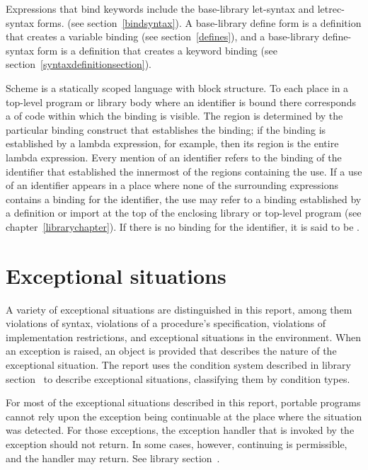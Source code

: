 Expressions that bind keywords include the base-library {\cf
  let-syntax} and {\cf letrec-syntax} forms.  (see
section~\ref{bindsyntax}).  A base-library {\cf define} form is a
definition that creates a variable binding (see
section~\ref{defines}), and a base-library {\cf define-syntax} form is
a definition that creates a keyword binding (see
section~\ref{syntaxdefinitionsection}).

\vest Scheme is a statically scoped language with
block structure.  To each place in a top-level program or library body where an identifier is bound 
there corresponds a  of code within which
the binding is visible.  The region is determined by the particular
binding construct that establishes the binding; if the binding is
established by a {\cf lambda} expression, for example, then its region
is the entire {\cf lambda} expression.  Every mention of an identifier
refers to the binding of the identifier that established the
innermost of the regions containing the use.  If a use of an
identifier appears in a place where none of the surrounding expressions
contains a binding for the identifier, the use may refer to a
binding established by a definition or import at the top of the
enclosing library or top-level program
(see chapter~\ref{librarychapter}).
If there is no binding for the identifier,
it is said to be .

\section{Exceptional situations}
\label{exceptionalsituationsection}

A variety of exceptional situations
are distinguished in this report, among them violations of 
syntax, violations of a procedure's specification, violations of
implementation restrictions, and exceptional situations in the
environment.  When an exception is raised, an object is provided that
describes the nature of the exceptional situation.  The report uses
the condition system described in library section~ to
describe exceptional situations, classifying them by condition types.

For most of the exceptional situations described in this report,
portable programs cannot rely upon the exception being continuable
at the place where the situation was detected.
For those exceptions, the exception handler that is invoked by the
exception should not return.
In some cases, however, continuing is permissible, and the
handler may return.  See library section~.

